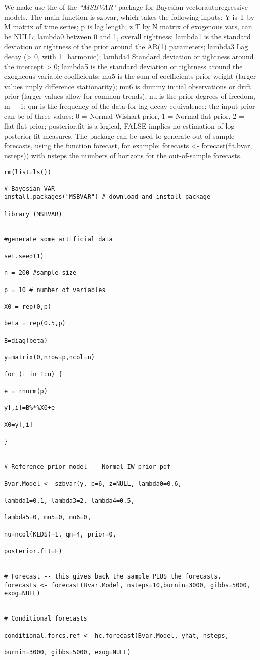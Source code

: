 \documentclass[12pt]{article}
\begin{document}
We make use the of the \emph{``MSBVAR"} package for Bayesian vectorautoregressive models. The main function is szbvar, which takes the following inputs: Y is T by M matrix of time series; p is lag length; z T by N matrix of exogenous vars, can be NULL; lambda0 between 0 and 1, overall tightness; lambda1 is the standard deviation or tightness of the prior around the AR(1) parameters; lambda3 Lag decay (> 0, with 1=harmonic); lambda4 Standard deviation or tightness around the intercept > 0; lambda5 is the standard deviation or tightness around the exogneous variable coefficients; mu5 is the sum of coefficients prior weight (larger values imply difference stationarity); mu6 is dummy initial observations or drift prior (larger values allow for common trends); nu is the prior degrees of freedom, m + 1; qm is the frequency of the data for lag decay equivalence; the input prior can be of three values: 0 = Normal-Wishart prior, 1 = Normal-flat prior, 2 = flat-flat prior; posterior.fit is a logical, FALSE implies no estimation of log-posterior fit measures.
The package can be used to generate out-of-sample forecasts, using the function forecast, for example:
forecasts <- forecast(fit.bvar, nsteps)) with nsteps the numbers of horizons for the out-of-sample forecasts.

\begin{lstlisting}[title=\textbf{Bayesian VAR}]
rm(list=ls())

# Bayesian VAR
install.packages("MSBVAR") # download and install package

library (MSBVAR)


#generate some artificial data

set.seed(1)

n = 200 #sample size

p = 10 # number of variables

X0 = rep(0,p)

beta = rep(0.5,p)

B=diag(beta)

y=matrix(0,nrow=p,ncol=n)

for (i in 1:n) {

e = rnorm(p)

y[,i]=B%*%X0+e

X0=y[,i]

}


# Reference prior model -- Normal-IW prior pdf

Bvar.Model <- szbvar(y, p=6, z=NULL, lambda0=0.6,

lambda1=0.1, lambda3=2, lambda4=0.5,

lambda5=0, mu5=0, mu6=0,

nu=ncol(KEDS)+1, qm=4, prior=0,

posterior.fit=F)


# Forecast -- this gives back the sample PLUS the forecasts.
forecasts <- forecast(Bvar.Model, nsteps=10,burnin=3000, gibbs=5000, exog=NULL)


# Conditional forecasts

conditional.forcs.ref <- hc.forecast(Bvar.Model, yhat, nsteps,

burnin=3000, gibbs=5000, exog=NULL)

\end{lstlisting}
\end{document}
